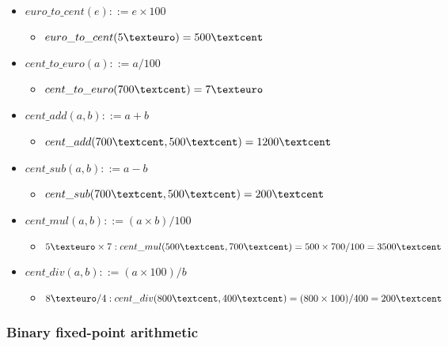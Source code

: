 \documentclass[12pt]{article}
\begin{document}
\begin{itemize}
	\item $euro\_to\_cent(e) \mathrel{::=} e \times 100$
	\begin{itemize}
		\item $euro\_to\_cent (5 \texteuro) = 500 \textcent$
	\end{itemize}
	\item $cent\_to\_euro(a) \mathrel{::=} a/100$
	\begin{itemize}
		\item $cent\_to\_euro(700 \textcent) = 7 \texteuro$
	\end{itemize}
	\item $cent\_add(a, b) \mathrel{::=} a+b$
	\begin{itemize}
		\item $cent\_add(700 \textcent, 500 \textcent) = 1200 \textcent$
	\end{itemize}
	\item $cent\_sub(a, b) \mathrel{::=} a-b$
	\begin{itemize}
		\item $cent\_sub(700 \textcent, 500 \textcent) = 200 \textcent$
	\end{itemize}
	\item $cent\_mul(a, b) \mathrel{::=} (a \times b)/100$
	\begin{itemize}
		\item $5 \texteuro \times 7: cent\_mul(500 \textcent, 700 \textcent) = 500 \times 700 / 100 = 3500 \textcent$
	\end{itemize}
	\item $cent\_div(a, b) \mathrel{::=} (a \times 100)/b$
	\begin{itemize}
		\item $8 \texteuro / 4: cent\_div(800 \textcent, 400 \textcent) = (800 \times 100) / 400 = 200 \textcent$
	\end{itemize}
\end{itemize}

\subsubsection{Binary fixed-point arithmetic}
\end{document}

